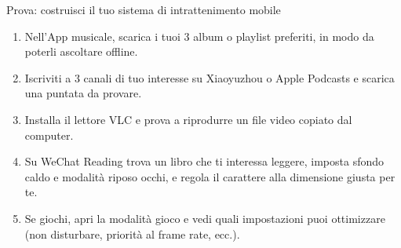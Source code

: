 \begin{tcbpractice}{Prova: costruisci il tuo sistema di intrattenimento mobile}
\begin{enumerate}
  \item Nell'App musicale, scarica i tuoi 3 album o playlist preferiti, in modo da poterli ascoltare offline.
  \item Iscriviti a 3 canali di tuo interesse su Xiaoyuzhou o Apple Podcasts e scarica una puntata da provare.
  \item Installa il lettore VLC e prova a riprodurre un file video copiato dal computer.
  \item Su WeChat Reading trova un libro che ti interessa leggere, imposta sfondo caldo e modalità riposo occhi, e regola il carattere alla dimensione giusta per te.
  \item Se giochi, apri la modalità gioco e vedi quali impostazioni puoi ottimizzare (non disturbare, priorità al frame rate, ecc.).
\end{enumerate}

\end{tcbpractice}

